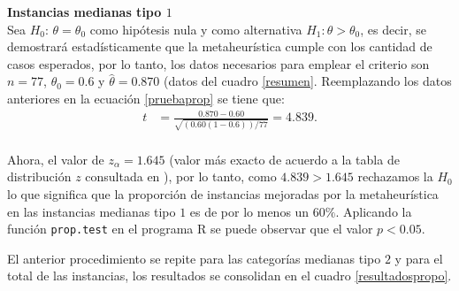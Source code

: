 \documentclass[preprint,12pt, pdftex]{elsarticle}
\begin{document}
\noindent \textbf{Instancias medianas tipo $1$} \\

Sea $H_{0}$: $\theta = \theta_{0}$ como hipótesis nula y como alternativa $H_{1}:\theta > \theta_{0}$, es decir, se demostrará estadísticamente que la metaheurística cumple con los cantidad de casos esperados, por lo tanto, los datos necesarios para emplear el criterio son $n = 77$, $\theta_{0} = 0.6$ y $\hat{\theta} = 0.870$ (datos del cuadro \ref{resumen}. Reemplazando los datos anteriores en la ecuación \ref{pruebaprop} se tiene que:
\begin{align}
\nonumber
    t & =  \frac{0.870 - 0.60}{\sqrt{(0.60(1-0.6))/77}} = 4.839. \\ \nonumber
\end{align}

Ahora, el valor de $z_{\alpha} = 1.645$ (valor más exacto de acuerdo a la tabla de distribución $z$ consultada en \citet{walpole}), por lo tanto, como $4.839 > 1.645$ rechazamos la $H_{0}$ lo que significa que la proporción de instancias mejoradas por la metaheurística en las instancias medianas tipo $1$ es de por lo menos un $60\%$. Aplicando la función \texttt{prop.test} en el programa R se puede observar que el valor $p < 0.05$.


El anterior procedimiento se repite para las categorías medianas tipo $2$ y para el total de las instancias, los resultados se consolidan en el cuadro \ref{resultadospropo}.
\end{document}
